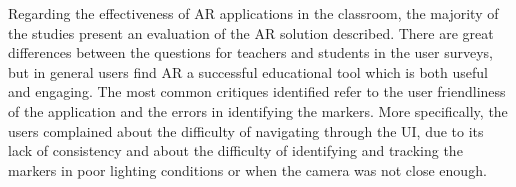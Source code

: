 Regarding the effectiveness of AR applications in the classroom, the majority of the studies present an evaluation of the \gls{AR} solution described. There are great differences between the questions for teachers and students in the user surveys, but in general users find \gls{AR} a successful educational tool which is both useful and engaging. The most common critiques identified refer to the user friendliness of the application and the errors in identifying the markers. More specifically, the users complained about the difficulty of navigating through the UI, due to its lack of consistency and about the difficulty of identifying and tracking the markers in poor lighting conditions or when the camera was not close enough.